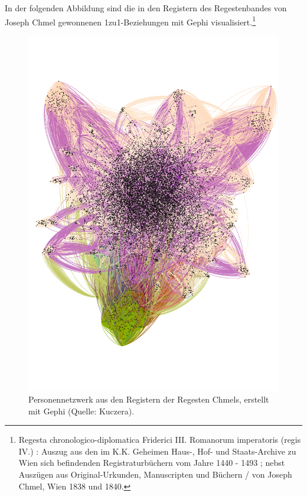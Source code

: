 \documentclass[ngerman,]{scrreprt}
\begin{document}
In der folgenden Abbildung sind die in den Registern des Regestenbandes von Joseph Chmel gewonnenen 1zu1-Beziehungen mit Gephi visualisiert.\footnote{Regesta chronologico-diplomatica Friderici III. Romanorum imperatoris (regis IV.) : Auszug aus den im K.K. Geheimen Haus-, Hof- und Staats-Archive zu Wien sich befindenden Registraturbüchern vom Jahre 1440 - 1493 ; nebst Auszügen aus Original-Urkunden, Manuscripten und Büchern / von Joseph Chmel, Wien 1838 und 1840.}

\begin{figure}
\centering
\includegraphics{Bilder/Chmelvisualisierung-v2.png}
\caption{Personennetzwerk aus den Registern der Regesten Chmels, erstellt mit Gephi (Quelle: Kuczera).}
\end{figure}
\end{document}
